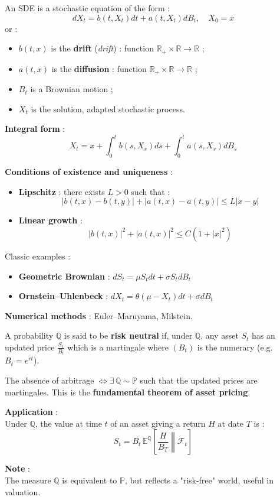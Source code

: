 \begin{f}
	
	An SDE is a stochastic equation of the form :
	\[
	dX_t = b(t, X_t) dt + a(t, X_t) dB_t, \quad X_0 = x
	\]
	or :
	\begin{itemize}
		\item $b(t,x)$ is the \textbf{drift} (\emph{drift}) : function $\mathbb{R}_+ \times \mathbb{R} \to \mathbb{R}$ ;
		\item $a(t,x)$ is the \textbf{diffusion} : function $\mathbb{R}_+ \times \mathbb{R} \to \mathbb{R}$ ;
		\item $B_t$ is a Brownian motion ;
		\item $X_t$ is the solution, adapted stochastic process.
	\end{itemize}
	
	\textbf{Integral form} :
	\[
	X_t = x + \int_0^t b(s, X_s) ds + \int_0^t a(s, X_s) dB_s
	\]
	
	\textbf{Conditions of existence and uniqueness} :
	\begin{itemize}
		\item \textbf{Lipschitz} : there exists $L > 0$ such that :
		\[
		|b(t,x) - b(t,y)| + |a(t,x) - a(t,y)| \leq L |x - y|
		\]
		\item \textbf{Linear growth} :
		\[
		|b(t,x)|^2 + |a(t,x)|^2 \leq C(1 + |x|^2)
		\]
	\end{itemize}
	
Classic examples :
	\begin{itemize}
		\item \textbf{Geometric Brownian} : $dS_t = \mu S_t dt + \sigma S_t dB_t$
		\item \textbf{Ornstein–Uhlenbeck} : $dX_t = \theta(\mu - X_t) dt + \sigma dB_t$
	\end{itemize}
	
	\textbf{Numerical methods} : Euler–Maruyama, Milstein.
	
\end{f}

\begin{f}
	
	A probability $\mathbb{Q}$ is said to be \textbf{risk neutral} if, under $\mathbb{Q}$, 
	any asset $S_t$ has an updated price $ \frac{S_t}{B_t}$ which is a martingale
	where $(B_t)$ is the numerary (e.g. $B_t = e^{rt}$).
	
	The absence of arbitrage $\iff \exists\, \mathbb{Q} \sim \mathbb{P}$ such that the updated prices are martingales.
	This is the \textbf{fundamental theorem of asset pricing}.
	
	\textbf{Application} :\\
	Under $\mathbb{Q}$, the value at time $t$ of an asset giving a return $H$ at date $T$ is :
	\[
	S_t = B_t\, \mathbb{E}^\mathbb{Q} \left[ \left. \frac{H}{B_T} \right\|  \mathcal{F}_t \right]
	\]
	
	\textbf{Note} :\\
	The measure $\mathbb{Q}$ is equivalent to $\mathbb{P}$, but reflects a "risk-free" world, useful in valuation.
	
\end{f}
\newcolumn

